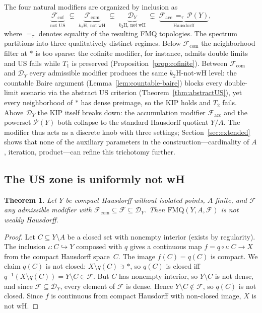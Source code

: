\documentclass[11pt]{article}
\newtheorem{theorem}{Theorem}[section]
\theoremstyle{definition}
\theoremstyle{remark}
\begin{document}
The four natural modifiers are organized by inclusion as
\[
\underbrace{\mathcal{F}_{\mathrm{cof}}}_{\text{not US}}
\;\subsetneq\;
\underbrace{\mathcal{F}_{\mathrm{com}}}_{k_2\mathrm{H},\,\mathrm{not\ wH}}
\;\subsetneq\;
\underbrace{\mathcal{D}_Y}_{k_2\mathrm{H},\,\mathrm{not\ wH}}
\;\subsetneq\;
\underbrace{\mathcal{F}_{\mathrm{acc}} \,=_\tau\, \mathcal{P}(Y)}_{\text{Hausdorff}},
\]
where $=_\tau$ denotes equality of the resulting FMQ topologies.
The spectrum partitions into three qualitatively distinct regimes.
Below $\mathcal{F}_{\mathrm{com}}$ the neighborhood filter at $\ast$
is too sparse: the cofinite modifier, for instance, admits double
limits and US fails while $T_1$ is preserved
(Proposition~\ref{prop:cofinite}).
Between $\mathcal{F}_{\mathrm{com}}$ and $\mathcal{D}_Y$ every
admissible modifier produces the same $k_2\mathrm{H}$-not-$\mathrm{wH}$
level: the countable Baire argument (Lemma~\ref{lem:countable-baire}) blocks
every double-limit scenario via the abstract US criterion
(Theorem~\ref{thm:abstractUS}), yet every neighborhood of $\ast$ has
dense preimage, so the KIP holds and $T_2$ fails.
Above $\mathcal{D}_Y$ the KIP itself breaks down: the accumulation
modifier $\mathcal{F}_{\mathrm{acc}}$ and the powerset $\mathcal{P}(Y)$
both collapse to the standard Hausdorff quotient $Y/A$.
The modifier thus acts as a discrete knob with three settings;
Section~\ref{sec:extended} shows that none of the auxiliary parameters
in the construction---cardinality of $A$, iteration, product---can
refine this trichotomy further.

\subsection{The US zone is uniformly not wH}

\begin{theorem}\label{thm:uniformzone}
Let $Y$ be compact Hausdorff without isolated points, $A$ finite, and $\mathcal{F}$ any
admissible modifier with $\mathcal{F}_{\mathrm{com}} \subseteq \mathcal{F} \subseteq \mathcal{D}_Y$.
Then $\mathrm{FMQ}(Y, A, \mathcal{F})$ is \emph{not} weakly Hausdorff.
\end{theorem}

\begin{proof}
Let $C \subseteq Y \setminus A$ be a closed set with nonempty interior (exists by regularity).
The inclusion $\iota\colon C \hookrightarrow Y$ composed with $q$ gives a continuous map
$f = q \circ \iota\colon C \to X$ from the compact Hausdorff space~$C$.
The image $f(C) = q(C)$ is compact.
We claim $q(C)$ is not closed: $X \setminus q(C) \ni \ast$, so $q(C)$ is closed iff
$q^{-1}(X \setminus q(C)) = Y \setminus C \in \mathcal{F}$. But $C$ has nonempty interior,
so $Y \setminus C$ is not dense, and since
$\mathcal{F} \subseteq \mathcal{D}_Y$, every element of $\mathcal{F}$ is dense.
Hence $Y \setminus C \notin \mathcal{F}$, so $q(C)$ is not closed.
Since $f$ is continuous from compact Hausdorff with non-closed image, $X$ is not wH.
\end{proof}
\end{document}
